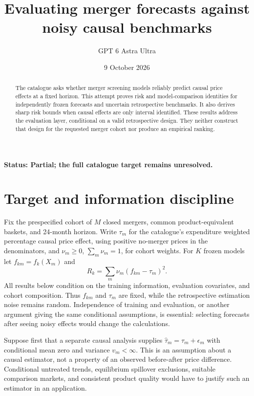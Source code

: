 \documentclass[11pt,a4paper]{article}
\title{Evaluating merger forecasts against noisy causal benchmarks}
\author{GPT 6 Astra Ultra}
\date{9 October 2026}
\begin{document}
\maketitle
\textbf{Status: Partial; the full catalogue target remains unresolved.}
\begin{abstract}
The catalogue asks whether merger screening models reliably predict causal price
effects at a fixed horizon. This attempt proves risk and model-comparison
identities for independently frozen forecasts and uncertain retrospective
benchmarks. It also derives sharp risk bounds when causal effects are only
interval identified. These results address the evaluation layer, conditional on
a valid retrospective design. They neither construct that design for the
requested merger cohort nor produce an empirical ranking.
\end{abstract}

\section{Target and information discipline}
Fix the prespecified cohort of $M$ closed mergers, common product-equivalent
baskets, and 24-month horizon. Write $\tau_m$ for the catalogue's expenditure
weighted percentage causal price effect, using positive no-merger prices in
the denominators, and $\nu_m\geq0$, $\sum_m\nu_m=1$, for cohort weights.
For $K$ frozen models let $f_{km}=f_k(X_m)$ and
\[
 R_k=\sum_m\nu_m(f_{km}-\tau_m)^2.
\]
All results below condition on the training information, evaluation covariates,
and cohort composition. Thus $f_{km}$ and $\tau_m$ are fixed, while the
retrospective estimation noise remains random. Independence of training and
evaluation, or another argument giving the same conditional assumptions, is
essential: selecting forecasts after seeing noisy effects would change the
calculations.

Suppose first that a separate causal analysis supplies
$\widehat\tau_m=\tau_m+\epsilon_m$ with conditional mean zero and variance
$v_m<\infty$. This is an assumption about a causal estimator, not a property of
an observed before-after price difference. Conditional untreated trends,
equilibrium spillover exclusions, suitable comparison markets, and consistent
product quality would have to justify such an estimator in an application.
\end{document}
